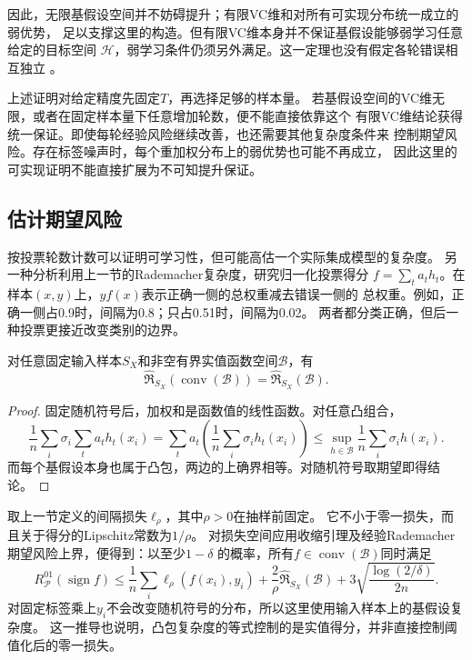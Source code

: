 因此，无限基假设空间并不妨碍提升；有限VC维和对所有可实现分布统一成立的弱优势，
足以支撑这里的构造。但有限VC维本身并不保证基假设能够弱学习任意给定的目标空间
$\mathcal H$，弱学习条件仍须另外满足。这一定理也没有假定各轮错误相互独立
。

上述证明对给定精度先固定$T$，再选择足够的样本量。
若基假设空间的VC维无限，或者在固定样本量下任意增加轮数，便不能直接依靠这个
有限VC维结论获得统一保证。即使每轮经验风险继续改善，也还需要其他复杂度条件来
控制期望风险。存在标签噪声时，每个重加权分布上的弱优势也可能不再成立，
因此这里的可实现证明不能直接扩展为不可知提升保证。

\subsection{估计期望风险}

按投票轮数计数可以证明可学习性，但可能高估一个实际集成模型的复杂度。
另一种分析利用上一节的Rademacher复杂度，研究归一化投票得分
$f=\sum_ta_th_t$。在样本$(x,y)$上，$yf(x)$表示正确一侧的总权重减去错误一侧的
总权重。例如，正确一侧占0.9时，间隔为0.8；只占0.51时，间隔为0.02。
两者都分类正确，但后一种投票更接近改变类别的边界。

\begin{theorem}[凸组合的Rademacher复杂度]
\label{thm:ensemble-convex-hull}
对任意固定输入样本$S_X$和非空有界实值函数空间$\mathcal B$，有
\[
 \widehat{\mathfrak R}_{S_X}(\operatorname{conv}(\mathcal B))
 =\widehat{\mathfrak R}_{S_X}(\mathcal B).
\]
\end{theorem}

\begin{proof}
固定随机符号后，加权和是函数值的线性函数。对任意凸组合，
\[
 \frac1n\sum_i\sigma_i\sum_ta_th_t(x_i)
 =\sum_ta_t\left(\frac1n\sum_i\sigma_ih_t(x_i)\right)
 \leq\sup_{h\in\mathcal B}\frac1n\sum_i\sigma_ih(x_i).
\]
而每个基假设本身也属于凸包，两边的上确界相等。对随机符号取期望即得结论。
\end{proof}

取上一节定义的间隔损失$\ell_\rho$，其中$\rho>0$在抽样前固定。
它不小于零一损失，而且关于得分的Lipschitz常数为$1/\rho$。
对损失空间应用收缩引理及经验Rademacher期望风险上界，便得到：以至少$1-\delta$
的概率，所有$f\in\operatorname{conv}(\mathcal B)$同时满足
\begin{equation}
 R_{\mathcal P}^{01}(\operatorname{sign}f)
 \leq\frac1n\sum_i\ell_\rho(f(x_i),y_i)
 +\frac{2}{\rho}\widehat{\mathfrak R}_{S_X}(\mathcal B)
 +3\sqrt{\frac{\log(2/\delta)}{2n}}.
 \label{eq:ensemble-margin-bound}
\end{equation}
对固定标签乘上$y_i$不会改变随机符号的分布，所以这里使用输入样本上的基假设复杂度。
这一推导也说明，凸包复杂度的等式控制的是实值得分，并非直接控制阈值化后的零一损失。

